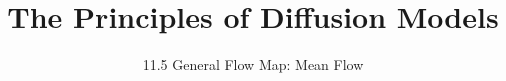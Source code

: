 ﻿%

\title{The Principles of Diffusion Models}
\subtitle{11.5 General Flow Map: Mean Flow}


\begin{frame}
    \titlepage
\end{frame}


